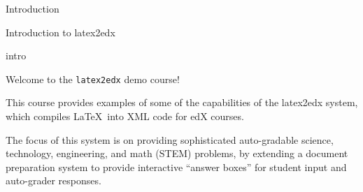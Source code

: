 
\begin{edXchapter}{Introduction}

\begin{edXsequential}{Introduction to latex2edx}

\begin{edXvertical}

\begin{edXtext}{intro}

Welcome to the \texttt{latex2edx} demo course!

This course provides examples of some of the capabilities of the
latex2edx system, which compiles \LaTeX\ into XML code for edX courses.

The focus of this system is on providing sophisticated auto-gradable
science, technology, engineering, and math (STEM) problems, by
extending a document preparation system to provide interactive
``answer boxes'' for student input and auto-grader responses.

\end{edXtext}

\end{edXvertical}

\end{edXsequential}

\end{edXchapter}
